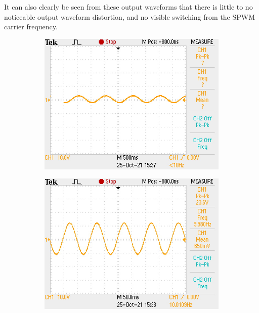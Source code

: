 \documentclass[a4paper,11pt]{article}
\begin{document}
It can also clearly be seen from these output waveforms that there is little to no noticeable output waveform distortion, and no visible switching from the SPWM carrier frequency.

\begin{figure}[H]
    \centering
    \begin{subfigure}{0.3\textwidth}
        \includegraphics[width=\columnwidth]{power_output/filter_output_1Hz.JPG}
        \label{F:out_1hz}
    \end{subfigure}
    \begin{subfigure}{0.3\textwidth}
        \includegraphics[width=\columnwidth]{power_output/filter_output_10Hz.JPG}

\end{subfigure}
\end{figure}
\end{document}
